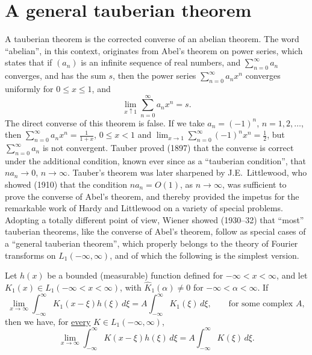 \section{A general tauberian theorem}
\label{sec:I-13}

A tauberian theorem is the corrected converse of an abelian theorem. The word ``abelian'', in this context, originates from Abel's theorem on power series, which states that if $(a_n)$ is an infinite sequence of real numbers, and $\sum_{n=0}^{\infty}a_n$ converges, and has the sum $s$, then the power series $\sum_{n=0}^{\infty}a_nx^n$ converges uniformly for $0\le x\le 1$, and
\begin{equation*}
\lim_{x\uparrow 1}\sum_{n=0}^{\infty}a_nx^n=s.
\end{equation*}
The direct converse of this theorem is false. If we take $a_n=(-1)^n$, $n=1,2,\ldots$, then $\sum_{n=0}^{\infty}a_nx^n=\frac{1}{1+x}$, $0\le x<1$ and $\lim_{x\to 1}\sum_{n=0}^{\infty}(-1)^nx^n=\frac12$, but $\sum_{n=0}^{\infty}a_n$ is not convergent. Tauber proved (1897) that the converse is correct under the additional condition, known ever since as a ``tauberian condition'', that $na_n\to 0$, $n\to\infty$. Tauber's theorem was later sharpened by J.E.\ Littlewood, who showed (1910) that the condition $na_n=O(1)$, as $n\to\infty$, was sufficient to prove the converse of Abel's theorem, and thereby provided the impetus for the remarkable work of Hardy and Littlewood on a variety of special problems. Adopting a totally different point of view, Wiener showed (1930--32) that ``most'' tauberian theorems, like the converse of Abel's theorem, follow as special cases of a ``general tauberian theorem'', which properly belongs to the theory of Fourier transforms on $L_1(-\infty,\infty)$, and of which the following is the simplest version.

\begin{theorem}\label{thm:I-24}
Let $h(x)$ be a bounded (measurable) function defined for $-\infty<x<\infty$, and let $K_1(x)\in L_1(-\infty<x<\infty)$, with $\widehat K_1(\alpha)\neq 0$ for $-\infty<\alpha<\infty$. If
\begin{equation}\label{eq:I-13.1}\tag{13.1}
\lim_{x\to\infty}\int_{-\infty}^{\infty}K_1(x-\xi)h(\xi)\,d\xi
=A\int_{-\infty}^{\infty}K_1(\xi)\,d\xi,\qquad\text{for some complex }A,
\end{equation}
then we have, for \underline{every} $K\in L_1(-\infty,\infty)$,
\begin{equation}\label{eq:I-13.2}\tag{13.2}
\lim_{x\to\infty}\int_{-\infty}^{\infty}K(x-\xi)h(\xi)\,d\xi=A\int_{-\infty}^{\infty}K(\xi)\,d\xi.
\end{equation}
\end{theorem}

